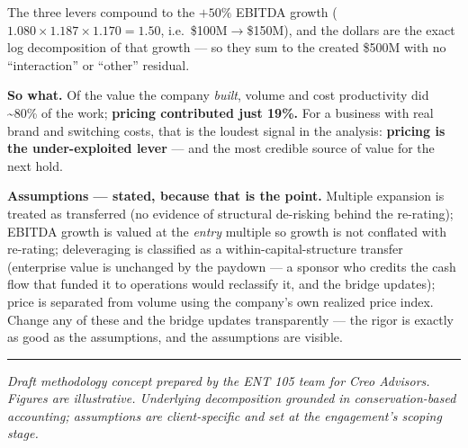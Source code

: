 \documentclass[11pt]{article}
\begin{document}
{\footnotesize The three levers compound to the $+50\%$ EBITDA growth
($1.080\times1.187\times1.170=1.50$, i.e.\ \$100M$\rightarrow$\$150M), and the dollars are the
exact log decomposition of that growth --- so they sum to the created \$500M with no
``interaction'' or ``other'' residual.}

\begin{sowhat}
\textbf{So what.} Of the value the company \emph{built}, volume and cost productivity did
\textasciitilde{}80\% of the work; \textbf{pricing contributed just 19\%.} For a business with
real brand and switching costs, that is the loudest signal in the analysis: \textbf{pricing is
the under-exploited lever} --- and the most credible source of value for the next hold.
\end{sowhat}

\textbf{Assumptions --- stated, because that is the point.} Multiple expansion is treated as
transferred (no evidence of structural de-risking behind the re-rating); EBITDA growth is
valued at the \emph{entry} multiple so growth is not conflated with re-rating; deleveraging is
classified as a within-capital-structure transfer (enterprise value is unchanged by the
paydown --- a sponsor who credits the cash flow that funded it to operations would reclassify
it, and the bridge updates); price is separated from volume using the company's own realized
price index. Change any of these and the bridge updates transparently
--- the rigor is exactly as good as the assumptions, and the assumptions are visible.

\vspace{6pt}\hrule\vspace{5pt}
{\footnotesize\itshape Draft methodology concept prepared by the ENT 105 team for Creo
Advisors. Figures are illustrative. Underlying decomposition grounded in conservation-based
accounting; assumptions are client-specific and set at the engagement's scoping stage.}
\end{document}
